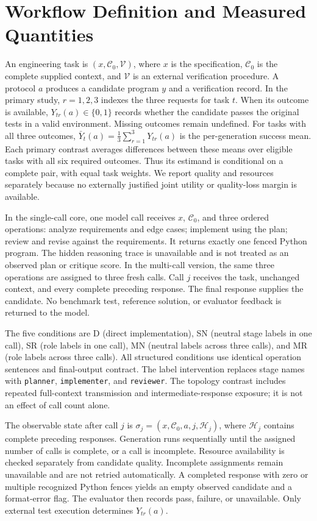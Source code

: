 \section{Workflow Definition and Measured Quantities}
\aieditnote
An engineering task is $(x,\mathcal{C}_0,\mathcal{V})$, where $x$ is the specification, $\mathcal{C}_0$ is the complete supplied context, and $\mathcal{V}$ is an external verification procedure. A protocol $a$ produces a candidate program $y$ and a verification record. In the primary study, $r=1,2,3$ indexes the three requests for task $t$. When its outcome is available, $Y_{tr}(a)\in\{0,1\}$ records whether the candidate passes the original tests in a valid environment. Missing outcomes remain undefined. For tasks with all three outcomes, $\bar Y_t(a)=\frac{1}{3}\sum_{r=1}^{3}Y_{tr}(a)$ is the per-generation success mean. Each primary contrast averages differences between these means over eligible tasks with all six required outcomes. Thus its estimand is conditional on a complete pair, with equal task weights. We report quality and resources separately because no externally justified joint utility or quality-loss margin is available.

In the single-call core, one model call receives $x$, $\mathcal{C}_0$, and three ordered operations: analyze requirements and edge cases; implement using the plan; review and revise against the requirements. It returns exactly one fenced Python program. The hidden reasoning trace is unavailable and is not treated as an observed plan or critique score. In the multi-call version, the same three operations are assigned to three fresh calls. Call $j$ receives the task, unchanged context, and every complete preceding response. The final response supplies the candidate. No benchmark test, reference solution, or evaluator feedback is returned to the model.

The five conditions are D (direct implementation), SN (neutral stage labels in one call), SR (role labels in one call), MN (neutral labels across three calls), and MR (role labels across three calls). All structured conditions use identical operation sentences and final-output contract. The label intervention replaces stage names with \texttt{planner}, \texttt{implementer}, and \texttt{reviewer}. The topology contrast includes repeated full-context transmission and intermediate-response exposure; it is not an effect of call count alone.

The observable state after call $j$ is $\sigma_j=(x,\mathcal{C}_0,a,j,\mathcal{H}_j)$, where $\mathcal{H}_j$ contains complete preceding responses. Generation runs sequentially until the assigned number of calls is complete, or a call is incomplete. Resource availability is checked separately from candidate quality. Incomplete assignments remain unavailable and are not retried automatically. A completed response with zero or multiple recognized Python fences yields an empty observed candidate and a format-error flag. The evaluator then records pass, failure, or unavailable. Only external test execution determines $Y_{tr}(a)$.

